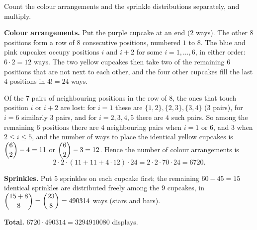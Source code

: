 Count the colour arrangements and the sprinkle distributions separately, and multiply.

\textbf{Colour arrangements.} Put the purple cupcake at an end ($2$ ways). The other $8$ positions form a row of $8$ consecutive positions, numbered $1$ to $8$. The blue and pink cupcakes occupy positions $i$ and $i+2$ for some $i=1,\dots,6$, in either order: $6\cdot2=12$ ways. The two yellow cupcakes then take two of the remaining $6$ positions that are not next to each other, and the four other cupcakes fill the last $4$ positions in $4!=24$ ways.

Of the $7$ pairs of neighbouring positions in the row of $8$, the ones that touch position $i$ or $i+2$ are lost: for $i=1$ these are $\{1,2\},\{2,3\},\{3,4\}$ ($3$ pairs), for $i=6$ similarly $3$ pairs, and for $i=2,3,4,5$ there are $4$ such pairs. So among the remaining $6$ positions there are $4$ neighbouring pairs when $i=1$ or $6$, and $3$ when $2\le i\le5$, and the number of ways to place the identical yellow cupcakes is $\dbinom62-4=11$ or $\dbinom62-3=12$. Hence the number of colour arrangements is
\[2\cdot2\cdot(11+11+4\cdot12)\cdot24=2\cdot2\cdot70\cdot24=6720.\]

\textbf{Sprinkles.} Put $5$ sprinkles on each cupcake first; the remaining $60-45=15$ identical sprinkles are distributed freely among the $9$ cupcakes, in $\dbinom{15+8}{8}=\dbinom{23}{8}=490314$ ways (stars and bars).

\textbf{Total.} $6720\cdot490314=\boxed{3294910080}$ displays.

